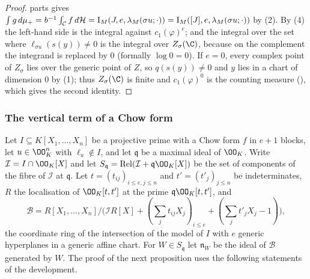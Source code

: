 \begin{proof}
parts gives $\int g\,d\mu_+=b^{-1}\int_{\mathcal C}f\,d\mathcal H=\operatorname{I}_M(J,e,\lambda_M(\sigma
u;\cdot))=\operatorname{I}_M([J],e,\lambda_M(\sigma u;\cdot))$ by (2). By (4) the left-hand side is the integral
against $c_1(\varphi)^e$; and the integral over the set where $\ell_{\sigma u}(s(y))\ne0$ is the integral
over $Z_\sigma(\C)$, because on the complement the integrand is replaced by $0$ (formally $\log0=0$).
If $e=0$, every complex point of $Z_\sigma$ lies over the generic point of $Z$, so $q(s(y))\ne0$ and $y$
lies in a chart of dimension $0$ by (1); thus $Z_\sigma(\C)$ is finite and $c_1(\varphi)^0$ is the counting
measure (), which gives the second identity.
\end{proof}

\subsubsection*{The vertical term of a Chow form}
Let $I\subseteq K[X_1,\dots,X_n]$ be a projective prime with a Chow form $f$ in $e+1$ blocks, let
$u\in\OO_K^n$ with $\ell_u\notin I$, and let $\mathfrak q$ be a maximal ideal of $\OO_K$. Write
$\mathcal I=I\cap\OO_K[X]$ and let $S_{\mathfrak q}=\covolRel(\mathcal I+\mathfrak q\OO_K[X])$ be the set of
components of the fibre of $\mathcal I$ at $\mathfrak q$. Let $t=(t_{ij})_{i\le e,j\le n}$ and
$t'=(t'_j)_{j\le n}$ be indeterminates, $R$ the localisation of $\OO_K[t,t']$ at the prime
$\mathfrak q\OO_K[t,t']$, and
\[
\mathcal B=R[X_1,\dots,X_n]\big/\bigl(\mathcal IR[X]+(\textstyle\sum_jt_{ij}X_j)_{i\le e}+
(\sum_jt'_jX_j-1)\bigr),
\]
the coordinate ring of the intersection of the model of $I$ with $e$ generic hyperplanes in a generic
affine chart. For $W\in S_{\mathfrak q}$ let $\mathfrak n_W$ be the ideal of $\mathcal B$ generated by $W$.
The proof of the next proposition uses the following statements of the development.
